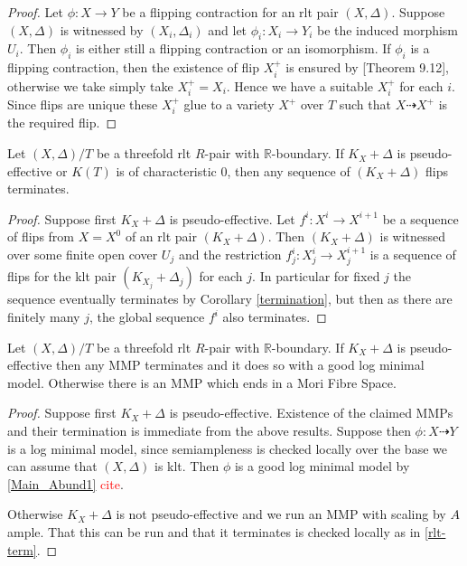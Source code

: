 \documentclass[a4paper,12pt]{amsart}
\newcommand\myworries[1]{\textcolor{red}{#1}}
\begin{document}
	\begin{proof}
	Let $\phi:X \to Y$ be a flipping contraction for an rlt pair $(X,\Delta)$. Suppose $(X,\Delta)$ is witnessed by $(X_{i},\Delta_{i})$ and let $\phi_{i}:X_{i} \to Y_{i}$ be the induced morphism $U_{i}$. Then $\phi_{i}$ is either still a flipping contraction or an isomorphism. If $\phi_{i}$ is a flipping contraction, then the existence of flip $X_{i}^{+}$ is ensured by \cite{bhatt2020globally+}[Theorem 9.12], otherwise we take simply take $X_{i}^{+}=X_{i}$. Hence we have a suitable $X_{i}^{+}$ for each $i$. Since flips are unique these $X_{i}^{+}$ glue to a variety $X^{+}$ over $T$ such that $X \dashrightarrow X^{+}$ is the required flip.
	\end{proof}
	
	\begin{theorem}\label{rlt-term}
		Let $(X,\Delta)/T$ be a threefold rlt $R$-pair with $\mathbb{R}$-boundary. If $K_{X}+\Delta$ is pseudo-effective or $K(T)$ is of characteristic $0$, then any sequence of $(K_{X}+\Delta)$ flips terminates.
	\end{theorem}
	
	\begin{proof}
		
		Suppose first $K_{X}+\Delta$ is pseudo-effective. Let $f^{i}:X^{i} \to X^{i+1}$ be a sequence of flips from $X=X^{0}$ of an rlt pair $(K_{X}+\Delta)$. Then $(K_{X}+\Delta)$ is witnessed over some finite open cover $U_{j}$ and the restriction $f^{i}_{j}:X_{j}^{i} \to X_{j}^{i+1}$ is a sequence of flips for the klt pair $(K_{X_{j}}+\Delta_{j})$ for each $j$. In particular for fixed $j$ the sequence eventually terminates by Corollary \ref{termination}, but then as there are finitely many $j$, the global sequence $f^{i}$ also terminates.
	\end{proof}

\begin{theorem}\label{rltmmp}
	Let $(X,\Delta)/T$ be a threefold rlt $R$-pair with $\mathbb{R}$-boundary. If $K_{X}+\Delta$ is pseudo-effective then any MMP terminates and it does so with a good log minimal model. Otherwise there is an MMP which ends in a Mori Fibre Space. 
\end{theorem}


\begin{proof}
	Suppose first $K_{X}+\Delta$ is pseudo-effective.
	Existence of the claimed MMPs and their termination is immediate from the above results. Suppose then $\phi:X \dashrightarrow Y$ is a log minimal model, since semiampleness is checked locally over the base we can assume that $(X,\Delta)$ is klt. Then $\phi$ is a good log minimal model by \autoref{Main_Abund1} \myworries{cite}.
	
	Otherwise $K_{X}+\Delta$ is not pseudo-effective and we run an MMP with scaling by $A$ ample. That this can be run and that it terminates is checked locally as in \autoref{rlt-term}.
\end{proof}
\end{document}
